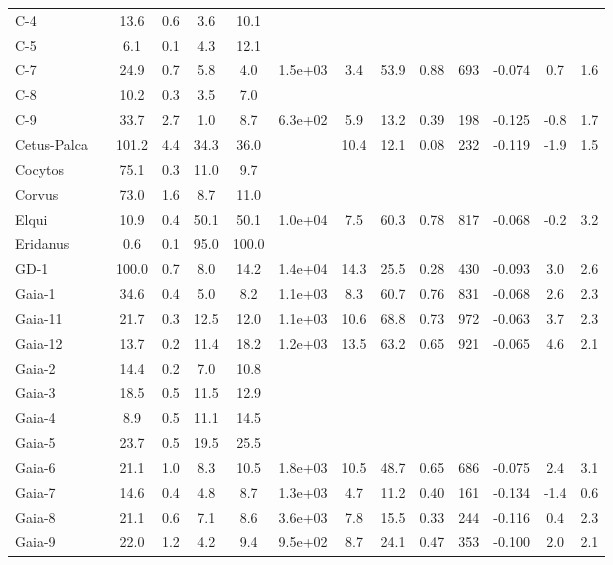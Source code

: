 \begin{tabular}{llSSSSSSSSrSSS}
C-4 &  & 13.6 & 0.6 & 3.6 & 10.1 &  &  &  &  &  &  &  &  \\
C-5 &  & 6.1 & 0.1 & 4.3 & 12.1 &  &  &  &  &  &  &  &  \\
C-7 &  & 24.9 & 0.7 & 5.8 & 4.0 & 1.5e+03 & 3.4 & 53.9 & 0.88 & 693 & -0.074 & 0.7 & 1.6 \\
C-8 &  & 10.2 & 0.3 & 3.5 & 7.0 &  &  &  &  &  &  &  &  \\
C-9 &  & 33.7 & 2.7 & 1.0 & 8.7 & 6.3e+02 & 5.9 & 13.2 & 0.39 & 198 & -0.125 & -0.8 & 1.7 \\
Cetus-Palca &  & 101.2 & 4.4 & 34.3 & 36.0 &  & 10.4 & 12.1 & 0.08 & 232 & -0.119 & -1.9 & 1.5 \\
Cocytos &  & 75.1 & 0.3 & 11.0 & 9.7 &  &  &  &  &  &  &  &  \\
Corvus &  & 73.0 & 1.6 & 8.7 & 11.0 &  &  &  &  &  &  &  &  \\
Elqui &  & 10.9 & 0.4 & 50.1 & 50.1 & 1.0e+04 & 7.5 & 60.3 & 0.78 & 817 & -0.068 & -0.2 & 3.2 \\
Eridanus &  & 0.6 & 0.1 & 95.0 & 100.0 &  &  &  &  &  &  &  &  \\
GD-1 &  & 100.0 & 0.7 & 8.0 & 14.2 & 1.4e+04 & 14.3 & 25.5 & 0.28 & 430 & -0.093 & 3.0 & 2.6 \\
Gaia-1 &  & 34.6 & 0.4 & 5.0 & 8.2 & 1.1e+03 & 8.3 & 60.7 & 0.76 & 831 & -0.068 & 2.6 & 2.3 \\
Gaia-11 &  & 21.7 & 0.3 & 12.5 & 12.0 & 1.1e+03 & 10.6 & 68.8 & 0.73 & 972 & -0.063 & 3.7 & 2.3 \\
Gaia-12 &  & 13.7 & 0.2 & 11.4 & 18.2 & 1.2e+03 & 13.5 & 63.2 & 0.65 & 921 & -0.065 & 4.6 & 2.1 \\
Gaia-2 &  & 14.4 & 0.2 & 7.0 & 10.8 &  &  &  &  &  &  &  &  \\
Gaia-3 &  & 18.5 & 0.5 & 11.5 & 12.9 &  &  &  &  &  &  &  &  \\
Gaia-4 &  & 8.9 & 0.5 & 11.1 & 14.5 &  &  &  &  &  &  &  &  \\
Gaia-5 &  & 23.7 & 0.5 & 19.5 & 25.5 &  &  &  &  &  &  &  &  \\
Gaia-6 &  & 21.1 & 1.0 & 8.3 & 10.5 & 1.8e+03 & 10.5 & 48.7 & 0.65 & 686 & -0.075 & 2.4 & 3.1 \\
Gaia-7 &  & 14.6 & 0.4 & 4.8 & 8.7 & 1.3e+03 & 4.7 & 11.2 & 0.40 & 161 & -0.134 & -1.4 & 0.6 \\
Gaia-8 &  & 21.1 & 0.6 & 7.1 & 8.6 & 3.6e+03 & 7.8 & 15.5 & 0.33 & 244 & -0.116 & 0.4 & 2.3 \\
Gaia-9 &  & 22.0 & 1.2 & 4.2 & 9.4 & 9.5e+02 & 8.7 & 24.1 & 0.47 & 353 & -0.100 & 2.0 & 2.1 \\

\end{tabular}

